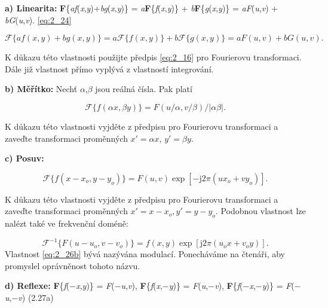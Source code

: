 \noindent \textbf{a) Linearita:} \textbf{F}\{\textit{af}(\textit{x},\textit{y})+\textit{bg}(\textit{x},\textit{y})\} = \textit{a}\textbf{F}\{\textit{f}(\textit{x},\textit{y})\} + \textit{b}\textbf{F}\{\textit{g}(\textit{x},\textit{y})\} = \textit{aF}(\textit{u},\textit{v}) + \textit{bG}(\textit{u},\textit{v}). \eqref{eq:2_24}

\begin{equation} \label{eq:2_24}
    \mathscr{F}\{af(x, y) + bg(x, y)\} = a\mathscr{F}\{f(x,y)\} + b\mathscr{F}\{g(x, y)\} = aF(u, v) + bG(u, v).
\end{equation}

\noindent K důkazu této vlastnosti použijte předpis \eqref{eq:2_16} pro Fourierovu transformaci. Dále již vlastnost přímo vyplývá z vlastností integrování.

\noindent \textbf{b) Měřítko:} Nechť $\alpha$,$\beta$ jsou reálná čísla. Pak platí

\begin{equation} \label{eq:2_25}
    \mathscr{F}\{f ( \alpha x, \beta y)\} = F( u / \alpha, v / \beta) / | \alpha \beta |.
\end{equation}

\noindent K důkazu této vlastnosti vyjděte z předpisu pro Fourierovu transformaci a zaveďte transformaci proměnných $x' = \alpha x$, $y' = \beta y$.

\noindent \textbf{c) Posuv:}

\begin{equation} \label{eq:2_26a}
    \mathscr{F}\{f(x - x_o, y - y_o)\} = F(u, v) \exp \left[ - \mathrm{j} 2 \pi (ux_o + vy_o)\right].
\end{equation}

\noindent K důkazu této vlastnosti vyjděte z předpisu pro Fourierovu transformaci a zaveďte transformaci proměnných $x' = x - x_o, y' = y - y_o$. Podobnou vlastnost lze nalézt také ve frekvenční doméně:

\begin{equation} \label{eq:2_26b}
    \mathscr{F}^{-1}\{F(u - u_o, v - v_o)\} = f(x, y) \exp \left[ \mathrm{j} 2 \pi (u_o x + v_o y)\right].
\end{equation}
Vlastnost \eqref{eq:2_26b} bývá nazývána modulací. Ponecháváme na čtenáři, aby promyslel oprávněnost tohoto názvu.

\noindent \textbf{d) Reflexe:} \textbf{F}\{\textit{f}($-$\textit{x},\textit{y})\} = \textit{F}($-$\textit{u},\textit{v}),     \textbf{F}\{\textit{f}(\textit{x},$-$\textit{y})\} = \textit{F}(\textit{u},$-$\textit{v}),     \textbf{F}\{\textit{f}($-$\textit{x},$-$\textit{y})\} = \textit{F}($-$\textit{u},$-$\textit{v}) (2.27a)

